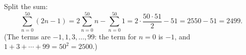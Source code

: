 Split the sum:
\[\sum_{n=0}^{50}(2n-1)=2\sum_{n=0}^{50}n-\sum_{n=0}^{50}1=2\cdot\dfrac{50\cdot51}{2}-51=2550-51=\boxed{2499}.\]
(The terms are $-1,1,3,\dots,99$: the term for $n=0$ is $-1$, and $1+3+\cdots+99=50^2=2500$.)
